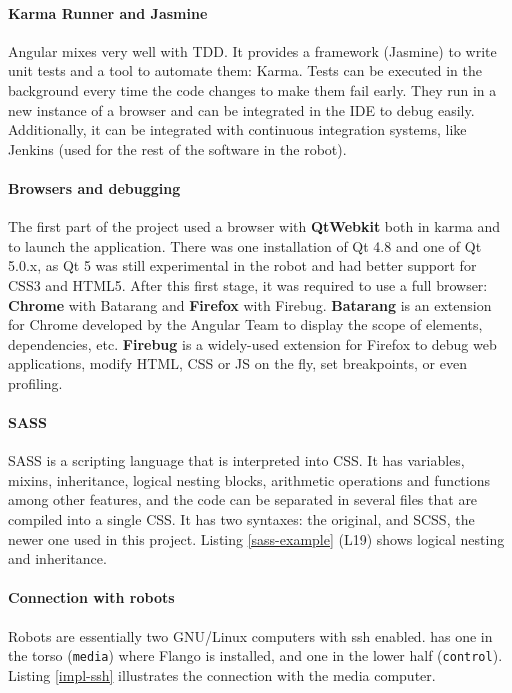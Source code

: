 \paragraph{Karma Runner and Jasmine} Angular mixes very well with \ac{TDD}. 
It provides a framework (Jasmine) to write unit tests and a tool to automate them: Karma.
Tests can be executed in the background every time the code changes to make them fail early.
They run in a new instance of a browser and can be integrated in the \ac{IDE} to debug easily.
Additionally, it can be integrated with continuous integration systems, like Jenkins (used for the rest of the software in the robot).

\paragraph{Browsers and debugging} The first part of the project used a browser with \textbf{QtWebkit} both in karma and to launch the application.
There was one installation of Qt 4.8 and one of Qt 5.0.x, as Qt 5 was still experimental in the robot and had better support for \ac{CSS3} and \ac{HTML5}.
After this first stage, it was required to use a full browser: \textbf{Chrome} with Batarang and \textbf{Firefox} with Firebug.
\textbf{Batarang} is an extension for Chrome developed by the Angular Team to display the scope of elements, dependencies, etc.
\textbf{Firebug} is a widely-used extension for Firefox to debug web applications, modify \ac{HTML}, \ac{CSS} or \ac{JS} on the fly, set breakpoints, or even profiling.

\paragraph{SASS} \ac{SASS} is a scripting language that is interpreted into \ac{CSS}.
It has variables, mixins, inheritance, logical nesting blocks, arithmetic operations and functions among other features, and the code can be separated in several files that are compiled into a single \ac{CSS}.
It has two syntaxes: the original, and \ac{SCSS}, the newer one used in this project.
Listing \ref{sass-example} (L19) shows logical nesting and inheritance.



\paragraph{Connection with robots} Robots are essentially two GNU/Linux computers with \ac{ssh} enabled.
 has one in the torso (\texttt{media}) where Flango is installed, and one in the lower half (\texttt{control}).
Listing \ref{impl-ssh} illustrates the connection with the media computer.

